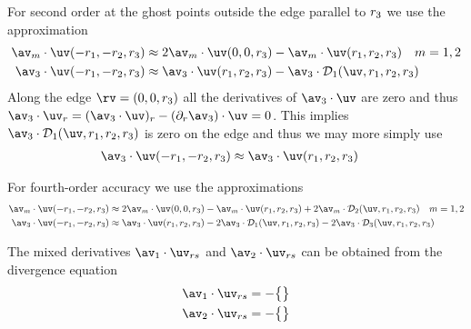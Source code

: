 
For second order at the ghost points outside the edge parallel to ${r_3}$ we use the approximation
\begin{align}
   \av_m\cdot\uv(-\ra,-\rb,\rc) &\approx 2 \av_m\cdot\uv(0,0,\rc) - \av_m\cdot\uv(\ra,\rb,\rc)  \quad m=1,2 \\
   \av_3\cdot\uv(-\ra,-\rb,\rc) &\approx \av_3\cdot\uv(\ra,\rb,\rc) - \av_3\cdot\Ds_1(\uv,\ra,\rb,\rc) 
\end{align}
Along the edge $\rv=(0,0,\rc)$ all the derivatives of $\av_3\cdot\uv$ are zero and thus
$\av_3\cdot\uv_r = (\av_3\cdot\uv)_r - (\partial_r\av_3)\cdot\uv = 0 $.
This implies $\av_3\cdot\Ds_1(\uv,\ra,\rb,\rc)$ is zero on the edge and thus 
we may more simply use
\begin{align}
   \av_3\cdot\uv(-\ra,-\rb,\rc) &\approx \av_3\cdot\uv(\ra,\rb,\rc) 
\end{align}

For fourth-order accuracy  we use the approximations
\begin{align}
  \av_m\cdot\uv(-\ra,-\rb,\rc) &\approx 2 \av_m\cdot\uv(0,0,\rc) - \av_m\cdot\uv(\ra,\rb,\rc) 
                          + 2\av_m\cdot\Ds_2(\uv,\ra,\rb,\rc) \quad m=1,2 \\
  \av_3\cdot\uv(-\ra,-\rb,\rc) &\approx \av_3\cdot\uv(\ra,\rb,\rc) - 2\av_3\cdot\Ds_1(\uv,\ra,\rb,\rc) 
                     - 2\av_3\cdot\Ds_3(\uv,\ra,\rb,\rc) 
\end{align}


The mixed derivatives $\av_1\cdot\uv_{rs}$ and $\av_2\cdot\uv_{rs}$ can be obtained from the
divergence equation
\begin{align}
  \av_1\cdot\uv_{rs} &= -\big\{ \big\} \\
  \av_2\cdot\uv_{rs} &= -\big\{ \big\} 
\end{align}


